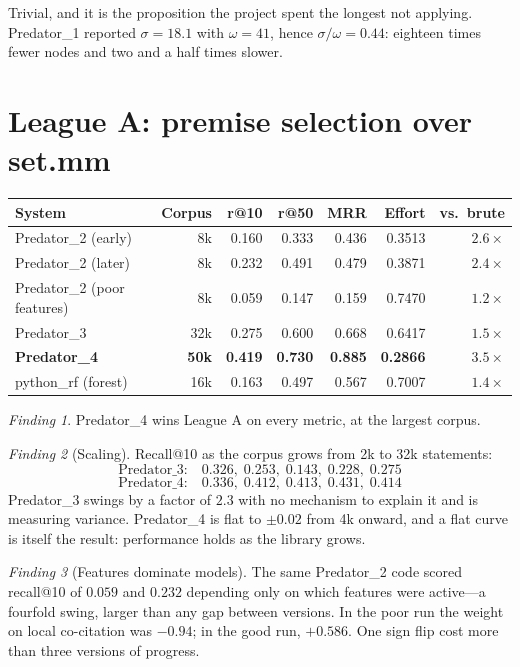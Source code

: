 \documentclass[11pt]{article}
\theoremstyle{plain}
\theoremstyle{definition}
\theoremstyle{remark}
\newtheorem{finding}{Finding}
\begin{document}
Trivial, and it is the proposition the project spent the longest not applying.
Predator\_1 reported $\sigma = 18.1$ with $\omega = 41$, hence
$\sigma/\omega = 0.44$: eighteen times fewer nodes and two and a half times
slower.

\section{League A: premise selection over set.mm}

\begin{center}
\small
\begin{tabular}{lrrrrrr}
\toprule
\textbf{System} & \textbf{Corpus} & \textbf{r@10} & \textbf{r@50} &
\textbf{MRR} & \textbf{Effort} & \textbf{vs.\ brute} \\
\midrule
Predator\_2 (early) & 8k & 0.160 & 0.333 & 0.436 & 0.3513 & $2.6\times$ \\
Predator\_2 (later) & 8k & 0.232 & 0.491 & 0.479 & 0.3871 & $2.4\times$ \\
Predator\_2 (poor features) & 8k & 0.059 & 0.147 & 0.159 & 0.7470 & $1.2\times$ \\
Predator\_3 & 32k & 0.275 & 0.600 & 0.668 & 0.6417 & $1.5\times$ \\
\textbf{Predator\_4} & \textbf{50k} & \textbf{0.419} & \textbf{0.730} &
\textbf{0.885} & \textbf{0.2866} & $\mathbf{3.5\times}$ \\
python\_rf (forest) & 16k & 0.163 & 0.497 & 0.567 & 0.7007 & $1.4\times$ \\
\bottomrule
\end{tabular}
\end{center}

\begin{finding}
Predator\_4 wins League A on every metric, at the largest corpus.
\end{finding}

\begin{finding}[Scaling]
Recall@10 as the corpus grows from 2k to 32k statements:
\[
\text{Predator\_3:}\quad 0.326,\; 0.253,\; 0.143,\; 0.228,\; 0.275
\]
\[
\text{Predator\_4:}\quad 0.336,\; 0.412,\; 0.413,\; 0.431,\; 0.414
\]
Predator\_3 swings by a factor of $2.3$ with no mechanism to explain it and is
measuring variance. Predator\_4 is flat to $\pm 0.02$ from 4k onward, and a flat
curve is itself the result: performance holds as the library grows.
\end{finding}

\begin{finding}[Features dominate models]
The same Predator\_2 code scored recall@10 of $0.059$ and $0.232$ depending only
on which features were active---a fourfold swing, larger than any gap between
versions. In the poor run the weight on local co-citation was $-0.94$; in the
good run, $+0.586$. One sign flip cost more than three versions of progress.
\end{finding}
\end{document}
